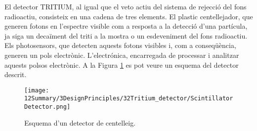 El detector TRITIUM, al igual que el veto actiu del sistema de rejecció del fons radioactiu, consisteix en una cadena de tres elements. El plastic centellejador, que generen fotons en l'espectre visible com a resposta a la detecció d'una partícula, ja siga un decaïment del triti a la mostra o un esdeveniment del fons radioactiu. Els photosensors, que detecten aquests fotons visibles i, com a conseqüència, generen un pols electrònic. L'electrónica, encarregada de processar i analitzar aquests polsos electrònic. A la Figura \ref{fig:EsquemaDetector} es pot veure un esquema del detector descrit.

\begin{figure}[hbtp]
\texttt{[image: 12Summary/3DesignPrinciples/32Tritium\_detector/ScintillatorDetector.png]}
\centering
\caption{Esquema d'un detector de centelleig.\label{fig:EsquemaDetector}}
\end{figure}